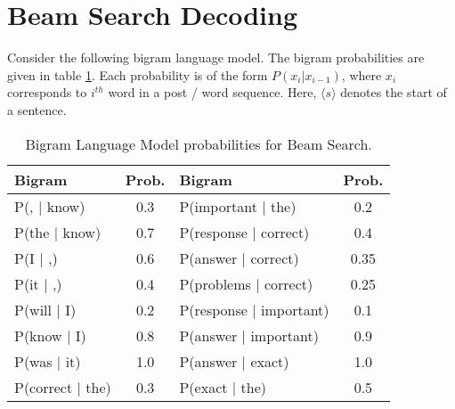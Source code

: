 \documentclass[11pt, letterpaper]{article}
\begin{document}
\newpage

\section{Beam Search Decoding}
Consider the following bigram language model. The bigram probabilities are given in table \ref{tab:bigram_prob}. Each probability is of the form $P(x_i|x_{i-1})$, where $x_i$ corresponds to $i^{th}$ word in a post / word sequence. Here, $\langle s \rangle$ denotes the start of a sentence.

\begin{table}[h!]
    \centering
    \begin{tabular}{|l|c|l|c|}
    \toprule
        Bigram & Prob. & Bigram & Prob.\\
        \hline
        P(, $|$ know) & 0.3 & P(important $|$ the) & 0.2 \\
        P(the $|$ know) & 0.7 & P(response $|$ correct) & 0.4 \\
        P(I $|$ ,) & 0.6 & P(answer $|$ correct) & 0.35  \\
        P(it $|$ ,) & 0.4 & P(problems $|$ correct) & 0.25  \\
        P(will $|$ I) & 0.2 & P(response $|$ important) & 0.1 \\
        P(know $|$ I) & 0.8 & P(answer $|$ important) & 0.9\\
        P(was $|$ it) & 1.0 & P(answer $|$ exact) & 1.0 \\
        P(correct $|$ the) & 0.3 &  P(exact $|$ the) & 0.5 \\
    \bottomrule
    \end{tabular}
    \caption{Bigram Language Model probabilities for Beam Search.}
    \label{tab:bigram_prob}
\end{table}
\end{document}
